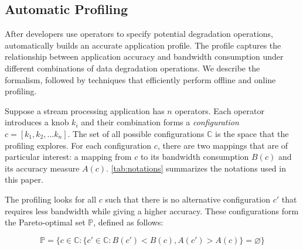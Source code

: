 \subsection{Automatic Profiling}
\label{sec:automatic-profiling}

After developers use \maybe{} operators to specify potential degradation operations,
\sysname{} automatically builds an accurate application profile. The profile
captures the relationship between application accuracy and bandwidth consumption
under different combinations of data degradation operations. We describe the
formalism, followed by techniques that efficiently perform offline and online
profiling.

 Suppose a stream processing application has $n$
\maybe{} operators. Each operator introduces a knob $k_i$ and their combination
forms a \textit{configuration} $c = [k_{1}, k_{2}, ... k_{n}]$. The set of all
possible configurations $\mathbb{C}$ is the space that the profiling
explores. For each configuration $c$, there are two mappings that are of
particular interest: a mapping from $c$ to its bandwidth consumption $B(c)$ and
its accuracy measure $A(c)$. \autoref{tab:notations} summarizes the notations used in
this paper.

The profiling looks for all $c$ such that there is no alternative
configuration $c'$ that requires less bandwidth while giving a higher
accuracy. These configurations form the Pareto-optimal set $\mathbb{P}$, defined
as follows:

{\small \vspace{-1em}
  \begin{equation}
  \mathbb{P} = \{ c \in \mathbb{C} : \{ c' \in \mathbb{C}: B(c') < B(c),
  A(c') > A(c) \} = \varnothing\}
  \label{eq:pareto}
\end{equation}
}%

